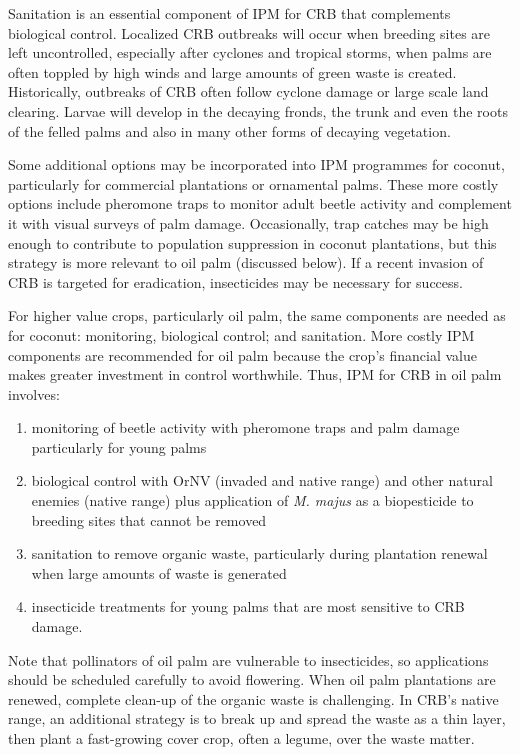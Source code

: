 \documentclass[twocolumn,letterpaper]{scrartcl}
\begin{document}
Sanitation  is  an  essential  component  of  IPM  for  CRB  that  complements biological control. Localized CRB outbreaks will occur when breeding sites are left uncontrolled, especially after cyclones and tropical storms, when palms are often toppled by high winds and large amounts of green waste is created. Historically, outbreaks of CRB often follow cyclone damage or large scale land clearing. Larvae will develop in the decaying fronds, the trunk and even the roots of the felled palms and also in many other forms of decaying vegetation. 

Some additional options may be incorporated into IPM programmes for coconut, particularly for commercial plantations or ornamental palms. These more costly options include pheromone traps to monitor adult beetle activity and complement it with visual surveys of palm damage. Occasionally, trap catches may be high enough to  contribute  to  population  suppression  in  coconut  plantations,  but  this  strategy  is  more relevant to oil palm (discussed below). If a recent invasion of CRB is targeted for eradication, insecticides may  be  necessary  for  success.

For higher value crops, particularly oil palm, the same components are needed as for coconut: monitoring, biological control; and sanitation. More costly IPM components are recommended for oil palm because the crop’s financial value makes greater investment in control worthwhile. Thus, IPM for CRB in oil palm involves: 
\begin{enumerate}
	\item monitoring of beetle activity with pheromone traps and palm damage particularly for young palms
	\item biological control with OrNV (invaded and native range) and other natural enemies (native range) plus application of \textit{M. majus} as a biopesticide to breeding sites that cannot be removed
	\item sanitation to remove organic waste, particularly during plantation renewal when large amounts of waste is generated
	\item insecticide treatments for young palms that are most sensitive to CRB damage.
\end{enumerate} 

Note that pollinators of oil palm are vulnerable to insecticides, so applications should be scheduled carefully to avoid flowering. When oil palm plantations are renewed, complete clean-up of the organic waste is challenging. In CRB’s native range, an additional strategy is to break up and spread the waste as a thin layer, then plant a fast-growing cover crop, often a legume, over the waste matter. 
\end{document}
